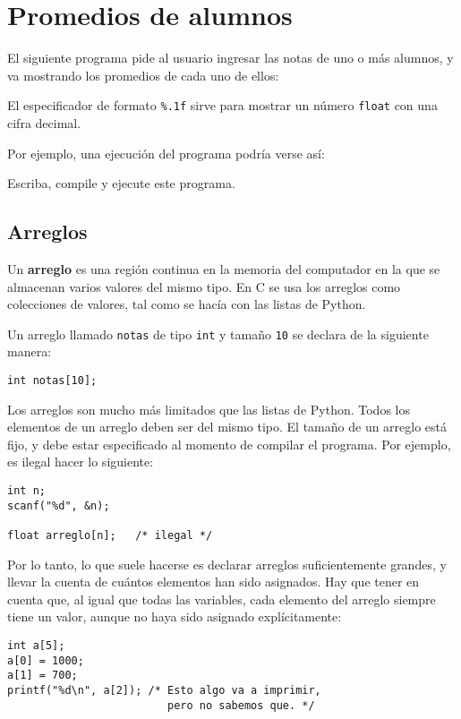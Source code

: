 \chapter{Promedios de alumnos}

El siguiente programa pide al usuario ingresar las notas de uno o más
alumnos, y va mostrando los promedios de cada uno de ellos:

El especificador de formato \lstinline!%.1f! sirve para mostrar un
número \lstinline!float! con una cifra decimal.

Por ejemplo, una ejecución del programa podría verse así:

Escriba, compile y ejecute este programa.

\section{Arreglos}

Un \textbf{arreglo} es una región continua en la memoria del computador
en la que se almacenan varios valores del mismo tipo. En C se usa los
arreglos como colecciones de valores, tal como se hacía con las listas
de Python.

Un arreglo llamado \lstinline!notas! de tipo \lstinline!int! y tamaño
\lstinline!10! se declara de la siguiente manera:

\begin{lstlisting}
int notas[10];
\end{lstlisting}

Los arreglos son mucho más limitados que las listas de Python. Todos los
elementos de un arreglo deben ser del mismo tipo. El tamaño de un
arreglo está fijo, y debe estar especificado al momento de compilar el
programa. Por ejemplo, es ilegal hacer lo siguiente:

\begin{lstlisting}
int n;
scanf("%d", &n);

float arreglo[n];   /* ilegal */
\end{lstlisting}

Por lo tanto, lo que suele hacerse es declarar arreglos suficientemente
grandes, y llevar la cuenta de cuántos elementos han sido asignados. Hay
que tener en cuenta que, al igual que todas las variables, cada elemento
del arreglo siempre tiene un valor, aunque no haya sido asignado
explícitamente:

\begin{lstlisting}
int a[5];
a[0] = 1000;
a[1] = 700;
printf("%d\n", a[2]); /* Esto algo va a imprimir,
                         pero no sabemos que. */
\end{lstlisting}

